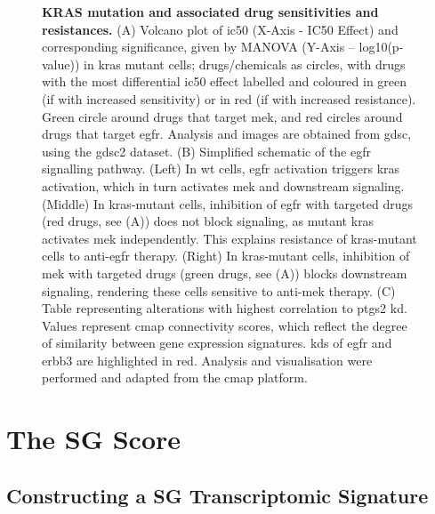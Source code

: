 {\begin{figure}[t]
	\captionsetup{labelformat=adja-page}
	\ContinuedFloat
	\caption[]{\textbf{KRAS mutation and associated drug sensitivities and resistances.} (A) Volcano plot of \gls{ic50} (X-Axis -  IC50 Effect) and corresponding significance, given by MANOVA (Y-Axis – log10(p-value)) in \gls{kras} mutant cells\cite{yang_genomics_2012}; drugs/chemicals as circles, with drugs with the most differential \gls{ic50} effect labelled and coloured in green (if with increased sensitivity) or in red (if with increased resistance). Green circle around drugs that target \gls{mek}, and red circles around drugs that target \gls{egfr}. Analysis and images are obtained from \gls{gdsc}\cite{yang_genomics_2012}, using the \gls{gdsc}2 dataset. (B) Simplified schematic of the \gls{egfr} signalling pathway. (Left) In \gls{wt} cells, \gls{egfr} activation triggers \gls{kras} activation, which in turn activates \gls{mek} and downstream signaling. (Middle) In \gls{kras}-mutant cells, inhibition of \gls{egfr} with targeted drugs (red drugs, see (A)) does not block signaling, as mutant \gls{kras} activates \gls{mek} independently. This explains resistance of \gls{kras}-mutant cells to anti-\gls{egfr} therapy. (Right) In \gls{kras}-mutant cells, inhibition of \gls{mek} with targeted drugs (green drugs, see (A)) blocks downstream signaling, rendering these cells sensitive to anti-\gls{mek} therapy. (C) Table representing alterations with highest correlation to \gls{ptgs2} \gls{kd}. Values represent \gls{cmap} connectivity scores, which reflect the degree of similarity between gene expression signatures. \glspl{kd} of \gls{egfr} and \gls{erbb3} are highlighted in red. Analysis and visualisation were performed and adapted from the \gls{cmap} platform\cite{subramanian_next_2017}.}
\end{figure}
\noindent

\section{The SG Score}

\subsection{Constructing a SG Transcriptomic Signature}

}
